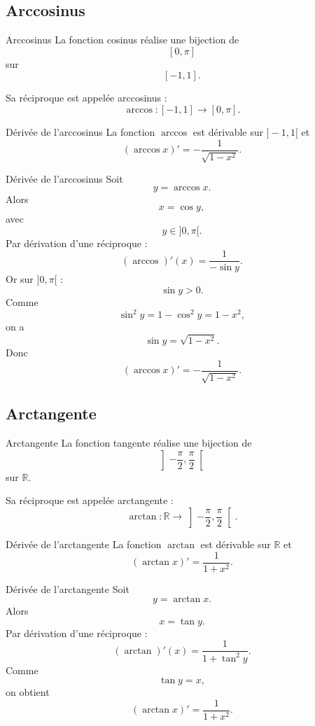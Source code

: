 \documentclass[11pt,a4paper]{article}
\newcommand{\R}{\mathbb{R}}
\begin{document}
\subsection{Arccosinus}

\begin{definitionbox}{Arccosinus}
La fonction cosinus réalise une bijection de
\[
[0,\pi]
\]
sur
\[
[-1,1].
\]

Sa réciproque est appelée arccosinus :
\[
\arccos : [-1,1]\to[0,\pi].
\]
\end{definitionbox}

\begin{theorembox}{Dérivée de l'arccosinus}
La fonction $\arccos$ est dérivable sur $]-1,1[$ et
\[
(\arccos x)'=-\frac1{\sqrt{1-x^2}}.
\]
\end{theorembox}

\begin{proofbox}{Dérivée de l'arccosinus}
Soit
\[
y=\arccos x.
\]
Alors
\[
x=\cos y,
\]
avec
\[
y\in]0,\pi[.
\]
Par dérivation d'une réciproque :
\[
(\arccos)'(x)=\frac1{-\sin y}.
\]
Or sur $]0,\pi[$ :
\[
\sin y>0.
\]
Comme
\[
\sin^2 y=1-\cos^2 y=1-x^2,
\]
on a
\[
\sin y=\sqrt{1-x^2}.
\]
Donc
\[
(\arccos x)'=-\frac1{\sqrt{1-x^2}}.
\]
\end{proofbox}

\subsection{Arctangente}

\begin{definitionbox}{Arctangente}
La fonction tangente réalise une bijection de
\[
\left]-\frac\pi2,\frac\pi2\right[
\]
sur $\R$.

Sa réciproque est appelée arctangente :
\[
\arctan:\R\to\left]-\frac\pi2,\frac\pi2\right[.
\]
\end{definitionbox}

\begin{theorembox}{Dérivée de l'arctangente}
La fonction $\arctan$ est dérivable sur $\R$ et
\[
(\arctan x)'=\frac1{1+x^2}.
\]
\end{theorembox}

\begin{proofbox}{Dérivée de l'arctangente}
Soit
\[
y=\arctan x.
\]
Alors
\[
x=\tan y.
\]
Par dérivation d'une réciproque :
\[
(\arctan)'(x)=\frac1{1+\tan^2 y}.
\]
Comme
\[
\tan y=x,
\]
on obtient
\[
(\arctan x)'=\frac1{1+x^2}.
\]
\end{proofbox}
\end{document}
